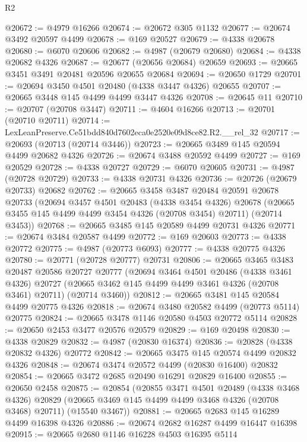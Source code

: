 \begin{lexlean}{R2}
\begin{coremodule}
@20672 := @4979 @16266
@20674 := @20672 @305 @1132
@20677 := @20674 @3492 @20597 @4499
@20678 := @169 @20527
@20679 := @4338 @20678
@20680 := @6070 @20606
@20682 := @4987 (@20679 @20680)
@20684 := @4338 @20682 @4326
@20687 := @20677 (@20656 @20684) @20659
@20693 := @20665 @3451 @3491 @20481 @20596 @20655 @20684
@20694 := @20650 @1729
@20701 := @20694 @3450 @4501 @20480 (@4338 @3447 @4326) @20655
@20707 := @20665 @3448 @145 @4499 @4499 @3447 @4326
@20708 := @20645 @11
@20710 := @20707 (@20708 @3447)
@20711 := @4604 @16266
@20713 := @20701 (@20710 @20711)
@20714 := LexLeanPreserve.Ce51bdd840d7602eca0e2520e09d8ce82.R2.__rel_32
@20717 := @20693 (@20713 (@20714 @3446))
@20723 := @20665 @3489 @145 @20594 @4499 @20682 @4326
@20726 := @20674 @3488 @20592 @4499
@20727 := @169 @20529
@20728 := @4338 @20727
@20729 := @6070 @20605
@20731 := @4987 (@20728 @20729)
@20733 := @4338 @20731 @4326
@20736 := @20726 (@20679 @20733) @20682
@20762 := @20665
    @3458
    @3487
    @20484
    @20591
    @20678
    @20733
    (@20694
      @3457
      @4501
      @20483
      (@4338 @3454 @4326)
      @20678
      (@20665 @3455 @145 @4499 @4499 @3454 @4326 (@20708 @3454) @20711)
      (@20714 @3453))
@20768 := @20665 @3485 @145 @20589 @4499 @20731 @4326
@20771 := @20674 @3484 @20587 @4499
@20772 := @169 @20603
@20773 := @4338 @20772
@20775 := @4987 (@20773 @6093)
@20777 := @4338 @20775 @4326
@20780 := @20771 (@20728 @20777) @20731
@20806 := @20665
    @3465
    @3483
    @20487
    @20586
    @20727
    @20777
    (@20694
      @3464
      @4501
      @20486
      (@4338 @3461 @4326)
      @20727
      (@20665 @3462 @145 @4499 @4499 @3461 @4326 (@20708 @3461) @20711)
      (@20714 @3460))
@20812 := @20665 @3481 @145 @20584 @4499 @20775 @4326
@20818 := @20674 @3480 @20582 @4499 (@20773 @5114) @20775
@20824 := @20665 @3478 @1146 @20580 @4503 @20772 @5114
@20828 := @20650 @2453 @3477 @20576 @20579
@20829 := @169 @20498
@20830 := @4338 @20829
@20832 := @4987 (@20830 @16374)
@20836 := @20828 (@4338 @20832 @4326) @20772
@20842 := @20665 @3475 @145 @20574 @4499 @20832 @4326
@20848 := @20674 @3474 @20572 @4499 (@20830 @16400) @20832
@20854 := @20665 @3472 @2685 @20490 @16291 @20829 @16400
@20855 := @20650 @2458
@20875 := @20854
    (@20855
      @3471
      @4501
      @20489
      (@4338 @3468 @4326)
      @20829
      (@20665 @3469 @145 @4499 @4499 @3468 @4326 (@20708 @3468) @20711)
      (@15540 @3467))
@20881 := @20665 @2683 @145 @16289 @4499 @16398 @4326
@20886 := @20674 @2682 @16287 @4499 @16447 @16398
@20915 := @20665
    @2680
    @1146
    @16228
    @4503
    @16395
    @5114

\end{coremodule}
\end{lexlean}
